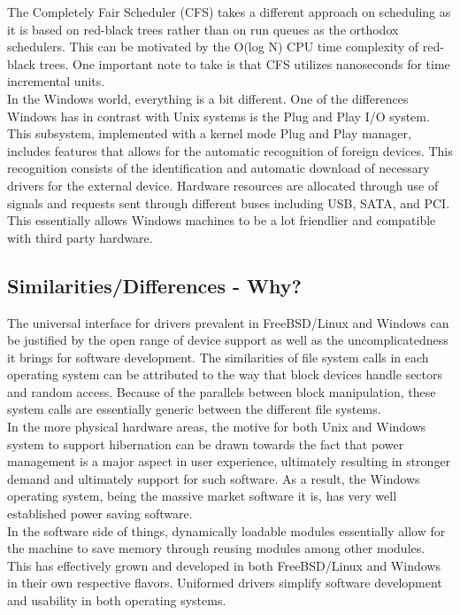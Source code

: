 \documentclass[letterpaper,10pt,titlepage]{article}
\begin{document}
The Completely Fair Scheduler (CFS) takes a different approach on scheduling as it is based on red-black trees rather than on run queues as the orthodox schedulers.  This can be motivated by the O(log N) CPU time complexity of red-black trees.\cite{lkd14}  One important note to take is that CFS utilizes nanoseconds for time incremental units.\\

In the Windows world, everything is a bit different.  One of the differences Windows has in contrast with Unix systems is the Plug and Play I/O system.  This subsystem, implemented with a kernel mode Plug and Play manager, includes features that allows for the automatic recognition of foreign devices.\cite{mwi8}  This recognition consists of the identification and automatic download of necessary drivers for the external device.  Hardware resources are allocated through use of signals and requests sent through different buses including USB, SATA, and PCI.  This essentially allows Windows machines to be a lot friendlier and compatible with third party hardware.\\

\subsection{Similarities/Differences - Why?}

The universal interface for drivers prevalent in FreeBSD/Linux and Windows can be justified by the open range of device support as well as the uncomplicatedness it brings for software development.  The similarities of file system calls in each operating system can be attributed to the way that block devices handle sectors and random access.  Because of the parallels between block manipulation, these system calls are essentially generic between the different file systems.\\

In the more physical hardware areas, the motive for both Unix and Windows system to support hibernation can be drawn towards the fact that power management is a major aspect in user experience, ultimately resulting in stronger demand and ultimately support for such software.  As a result, the Windows operating system, being the massive market software it is, has very well established power saving software.\\

In the software side of things, dynamically loadable modules essentially allow for the machine to save memory through reusing modules among other modules. This has effectively grown and developed in both FreeBSD/Linux and Windows in their own respective flavors.  Uniformed drivers simplify software development and usability in both operating systems.\\
\end{document}
